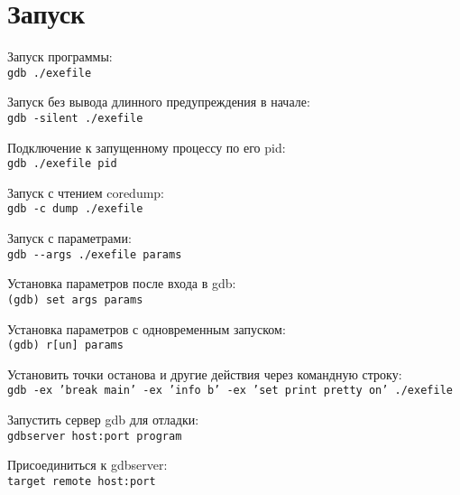 \section{Запуск}

\noindent Запуск программы: \\
\indent \texttt{gdb ./exefile}

\noindent Запуск без вывода длинного предупреждения в начале: \\
\indent \texttt{gdb -silent ./exefile}

\noindent Подключение к запущенному процессу по его pid: \\
\indent \texttt{gdb ./exefile pid}

\noindent Запуск с чтением coredump: \\
\indent \texttt{gdb -c dump ./exefile}

\noindent  Запуск с параметрами: \\
\indent \texttt{gdb -{-}args ./exefile params}

\noindent Установка параметров после входа в gdb: \\
\indent \texttt{(gdb) set args params}

\noindent Установка параметров с одновременным запуском: \\
\indent \texttt{(gdb) r[un] params}

\noindent Установить точки останова и другие действия через командную строку: \\
\indent \texttt{gdb -ex 'break main' -ex 'info b' -ex 'set print pretty on' ./exefile}

\noindent Запустить сервер gdb для отладки: \\
\indent \texttt{gdbserver host:port program}

\noindent Присоединиться к gdbserver: \\
\indent \texttt{target remote host:port}
